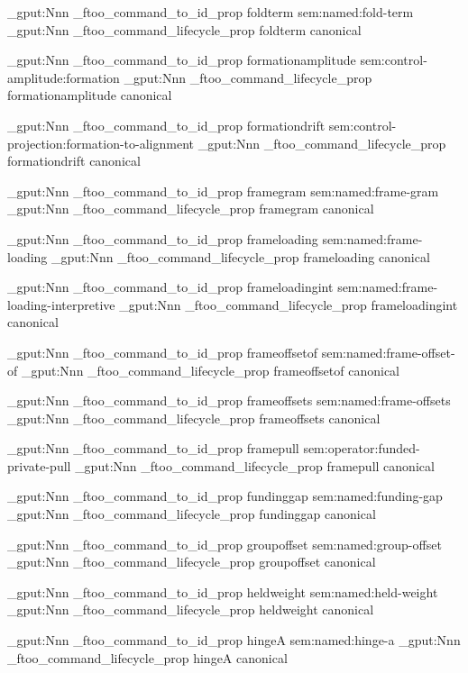\prop_gput:Nnn \g_ftoo_command_to_id_prop { foldterm } { sem:named:fold-term }
\prop_gput:Nnn \g_ftoo_command_lifecycle_prop { foldterm } { canonical }


\prop_gput:Nnn \g_ftoo_command_to_id_prop { formationamplitude } { sem:control-amplitude:formation }
\prop_gput:Nnn \g_ftoo_command_lifecycle_prop { formationamplitude } { canonical }


\prop_gput:Nnn \g_ftoo_command_to_id_prop { formationdrift } { sem:control-projection:formation-to-alignment }
\prop_gput:Nnn \g_ftoo_command_lifecycle_prop { formationdrift } { canonical }


\prop_gput:Nnn \g_ftoo_command_to_id_prop { framegram } { sem:named:frame-gram }
\prop_gput:Nnn \g_ftoo_command_lifecycle_prop { framegram } { canonical }


\prop_gput:Nnn \g_ftoo_command_to_id_prop { frameloading } { sem:named:frame-loading }
\prop_gput:Nnn \g_ftoo_command_lifecycle_prop { frameloading } { canonical }


\prop_gput:Nnn \g_ftoo_command_to_id_prop { frameloadingint } { sem:named:frame-loading-interpretive }
\prop_gput:Nnn \g_ftoo_command_lifecycle_prop { frameloadingint } { canonical }


\prop_gput:Nnn \g_ftoo_command_to_id_prop { frameoffsetof } { sem:named:frame-offset-of }
\prop_gput:Nnn \g_ftoo_command_lifecycle_prop { frameoffsetof } { canonical }


\prop_gput:Nnn \g_ftoo_command_to_id_prop { frameoffsets } { sem:named:frame-offsets }
\prop_gput:Nnn \g_ftoo_command_lifecycle_prop { frameoffsets } { canonical }


\prop_gput:Nnn \g_ftoo_command_to_id_prop { framepull } { sem:operator:funded-private-pull }
\prop_gput:Nnn \g_ftoo_command_lifecycle_prop { framepull } { canonical }


\prop_gput:Nnn \g_ftoo_command_to_id_prop { fundinggap } { sem:named:funding-gap }
\prop_gput:Nnn \g_ftoo_command_lifecycle_prop { fundinggap } { canonical }


\prop_gput:Nnn \g_ftoo_command_to_id_prop { groupoffset } { sem:named:group-offset }
\prop_gput:Nnn \g_ftoo_command_lifecycle_prop { groupoffset } { canonical }


\prop_gput:Nnn \g_ftoo_command_to_id_prop { heldweight } { sem:named:held-weight }
\prop_gput:Nnn \g_ftoo_command_lifecycle_prop { heldweight } { canonical }


\prop_gput:Nnn \g_ftoo_command_to_id_prop { hingeA } { sem:named:hinge-a }
\prop_gput:Nnn \g_ftoo_command_lifecycle_prop { hingeA } { canonical }


